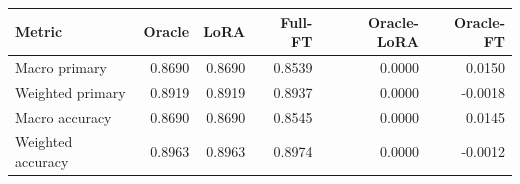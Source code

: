 \begin{tabular}{lrrrrr}
\toprule
Metric & Oracle & LoRA & Full-FT & Oracle-LoRA & Oracle-FT \\
\midrule
Macro primary & 0.8690 & 0.8690 & 0.8539 & 0.0000 & 0.0150 \\
Weighted primary & 0.8919 & 0.8919 & 0.8937 & 0.0000 & -0.0018 \\
Macro accuracy & 0.8690 & 0.8690 & 0.8545 & 0.0000 & 0.0145 \\
Weighted accuracy & 0.8963 & 0.8963 & 0.8974 & 0.0000 & -0.0012 \\
\bottomrule
\end{tabular}
